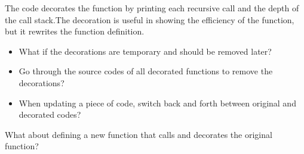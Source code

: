 \documentclass[letterpaper,10pt,english]{sphinxmanual}
\begin{document}
The code decorates the  function by printing each recursive call and the depth of the call stack.The decoration is useful in showing the efficiency of the function, but it rewrites the function definition.

\begin{itemize}
\item {} 
What if the decorations are temporary and should be removed later?

\item {} 
Go through the source codes of all decorated functions to remove the decorations?

\item {} 
When updating a piece of code, switch back and forth between original and decorated codes?

\end{itemize}

What about defining a new function that calls and decorates the original function?
\end{document}
